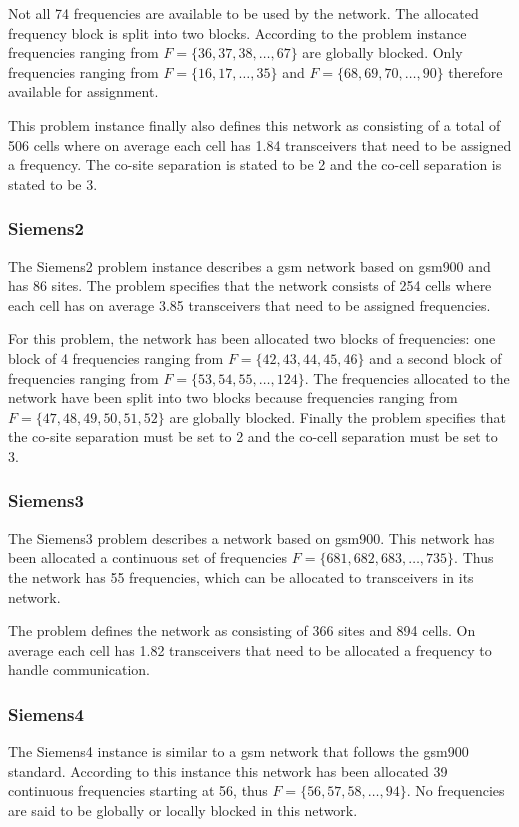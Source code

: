 Not all 74 frequencies are available to be used by the network. The allocated frequency block is split into two blocks. According to the problem instance frequencies ranging from $F= \{36,37,38,\dots,67\}$ are globally blocked. Only frequencies ranging from $F= \{16,17,\dots,35\}$ and $F= \{68,69,70,\dots,90\}$ therefore available for assignment.

This problem instance finally also defines this network as consisting of a total of 506 cells where on average each cell has 1.84 transceivers that need to be assigned a frequency. The co-site separation is stated to be 2 and the co-cell separation is stated to be 3.
\subsubsection{Siemens2}
The Siemens2 problem instance describes a \gls{gsm} network based on \gls{gsm}900 and has 86 sites. The problem specifies that the network consists of 254 cells where each cell has on average 3.85 transceivers that need to be assigned frequencies.

For this problem, the network has been allocated two blocks of frequencies: one block of 4 frequencies ranging from $F = \{42,43,44,45,46\}$ and a second block of frequencies ranging from $F= \{53,54,55,\dots,124\}$. The frequencies allocated to the network have been split into two blocks because frequencies ranging from $F = \{47,48,49,50,51,52\}$ are globally blocked. Finally the problem specifies that the co-site separation must be set to 2 and the co-cell separation must be set to 3.
\subsubsection{Siemens3}
The Siemens3 problem describes a network based on \gls{gsm}900. This network has been allocated a continuous set of frequencies $F= \{681,682,683, \dots, 735\}$. Thus the network has 55 frequencies, which can be allocated to transceivers in its network.

The problem defines the network as consisting of 366 sites and 894 cells. On average each cell has 1.82 transceivers that need to be allocated a frequency to handle communication.
\subsubsection{Siemens4}
The Siemens4 instance is similar to a \gls{gsm} network that follows the \gls{gsm}900 standard. According to this instance this network has been allocated 39 continuous frequencies starting at 56, thus $F = \{56,57,58,\dots,94\}$. No frequencies are said to be globally or locally blocked in this network.


